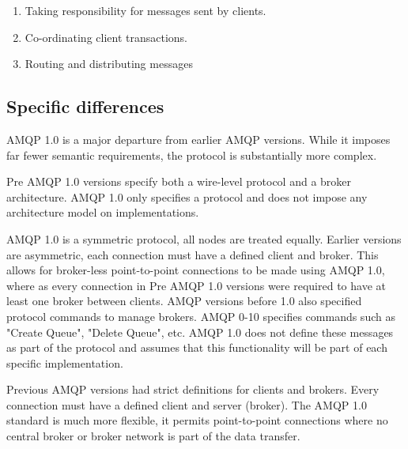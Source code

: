 \documentclass{thesis}
\begin{document}
\begin{enumerate}
\item Taking responsibility for messages sent by clients.
\item Co-ordinating client transactions.
\item Routing and distributing messages 
\end{enumerate}


\subsection {Specific differences}

AMQP 1.0 is a major departure from earlier AMQP versions.  While it imposes far fewer semantic requirements, the protocol is substantially more complex.   %

Pre AMQP 1.0 versions specify both a  wire-level protocol and a broker architecture.  AMQP 1.0 only specifies a protocol and does not impose any architecture model on implementations.  %

AMQP 1.0 is a symmetric protocol, all nodes are treated equally.  Earlier versions are asymmetric, each connection must have a defined client and broker.  This allows for broker-less point-to-point connections to be made using AMQP 1.0, where as every connection in Pre AMQP 1.0 versions were required to have at least one broker between clients.  AMQP versions before 1.0 also specified protocol commands to manage brokers.  AMQP 0-10 specifies commands such as "Create Queue", "Delete Queue", etc.  AMQP 1.0 does not define these messages as part of the protocol and assumes that this functionality will be part of each specific implementation.  %

Previous AMQP versions had strict definitions for clients and brokers.  Every connection must have a defined client and server (broker).  The AMQP 1.0 standard is much more flexible, it permits point-to-point connections where no central broker or broker network is part of the data transfer.  
\end{document}
